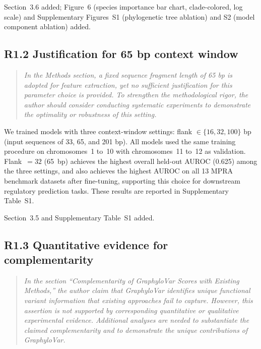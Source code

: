 \documentclass[11pt]{article}
\begin{document}
Section~3.6 added; Figure~6 (species importance bar chart, clade-colored,
log scale) and Supplementary Figures~S1 (phylogenetic tree ablation) and
S2 (model component ablation) added.

\bigskip

\subsection*{R1.2 Justification for 65 bp context window}

\begin{quote}
\itshape
In the Methods section, a fixed sequence fragment length of 65 bp is
adopted for feature extraction, yet no sufficient justification for
this parameter choice is provided.  To strengthen the methodological
rigor, the author should consider conducting systematic experiments to
demonstrate the optimality or robustness of this setting.
\end{quote}

We trained models with three context-window settings: flank $\in \{16,
32, 100\}$ bp (input sequences of 33, 65, and 201 bp).  All models used
the same training procedure on chromosomes~1 to~10 with chromosomes~11
to~12 as validation.  Flank~$= 32$ (65~bp) achieves the highest overall
held-out AUROC (0.625) among the three settings, and also achieves the
highest AUROC on all 13 MPRA benchmark datasets after fine-tuning,
supporting this choice for downstream regulatory prediction tasks.
These results are reported in Supplementary Table~S1.

Section~3.5 and Supplementary Table~S1 added.

\bigskip

\subsection*{R1.3 Quantitative evidence for complementarity}

\begin{quote}
\itshape
In the section ``Complementarity of GraphyloVar Scores with Existing
Methods,'' the author claim that GraphyloVar identifies unique functional
variant information that existing approaches fail to capture.  However,
this assertion is not supported by corresponding quantitative or
qualitative experimental evidence.  Additional analyses are needed to
substantiate the claimed complementarity and to demonstrate the unique
contributions of GraphyloVar.
\end{quote}
\end{document}
